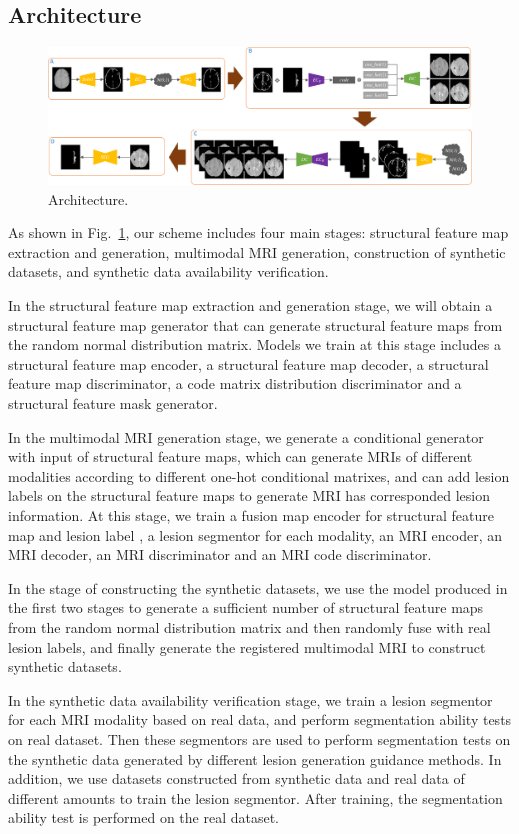\documentclass[letterpaper]{article} %
\begin{document}
\subsection{Architecture}
\begin{figure}[t]
	\centering
	\includegraphics[width=0.98\columnwidth]{figures/architecture}
	\caption{Architecture.}
	\label{architecture}
\end{figure}
As shown in Fig.~\ref{architecture}, our scheme includes four main stages: structural feature map extraction and generation, multimodal MRI generation, construction of synthetic datasets, and synthetic data availability verification.

In the structural feature map extraction and generation stage, we will obtain a structural feature map generator that can generate structural feature maps from the random normal distribution matrix. Models we train at this stage includes a structural feature map encoder, a structural feature map decoder, a structural feature map discriminator, a code matrix distribution discriminator and a structural feature mask generator.

In the multimodal MRI generation stage, 
we generate a conditional generator with input of structural feature maps, which can generate MRIs of different modalities according to different one-hot conditional matrixes, and can add lesion labels on the structural feature maps to generate MRI has corresponded lesion information. At this stage, we train a fusion map encoder for structural feature map and lesion label , a lesion segmentor for each modality, an MRI encoder, an MRI decoder, an MRI discriminator and an MRI code discriminator.

In the stage of constructing the synthetic datasets, we use the model produced in the first two stages to generate a sufficient number of structural feature maps from the random normal distribution matrix and then randomly fuse with real lesion labels, and finally generate the registered multimodal MRI to construct synthetic datasets.

In the synthetic data availability verification stage, we train a lesion segmentor for each MRI modality based on real data, and perform segmentation ability tests on real dataset. Then these segmentors are used to perform segmentation tests on the synthetic data generated by different lesion generation guidance methods. In addition, we use datasets constructed from synthetic data and real data of different amounts to train the lesion segmentor. After training, the segmentation ability test is performed on the real dataset.
\end{document}
